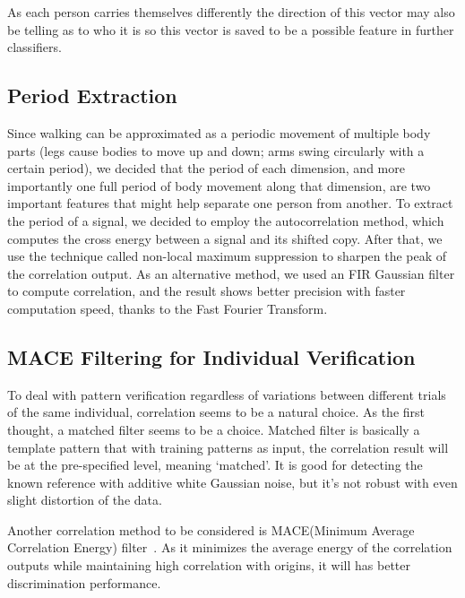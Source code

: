 \documentclass[10pt,twocolumn,letterpaper]{article}
\begin{document}
\begin{figure}[t]
\begin{center}
\fbox{\rule{0pt}{2in} \rule{0.9\linewidth}{0pt}}
   \caption{}
\end{center}
\end{figure}

As each person carries themselves differently the direction of this vector may also be telling as to who it is so this vector is saved to be a possible feature in further classifiers.

\subsection{Period Extraction}
Since walking can be approximated as a periodic movement of multiple body parts (legs cause bodies to move up and down; arms swing circularly with a certain period), we decided that the period of each dimension, and more importantly one full period of body movement along that dimension, are two important features that might help separate one person from another. To extract the period of a signal, we decided to employ the autocorrelation method, which computes the cross energy between a signal and its shifted copy. After that, we use the technique called non-local maximum suppression to sharpen the peak of the correlation output. As an alternative method, we used an FIR Gaussian filter to compute correlation, and the result shows better precision with faster computation speed, thanks to the Fast Fourier Transform.

\subsection{MACE Filtering for Individual Verification}
To deal with pattern verification regardless of variations between different trials of the same individual, correlation seems to be a natural choice. As the first thought, a matched filter seems to be a choice. Matched filter is basically a template pattern that with training patterns as input, the correlation result will be at the pre-specified level, meaning ‘matched’. It is good for detecting the known reference with additive white Gaussian noise, but it’s not robust with even slight distortion of the data. 

Another correlation method to be considered is MACE(Minimum Average Correlation Energy) filter~\cite{Author01}. As it minimizes the average energy of the correlation outputs while maintaining high correlation with origins, it will has better discrimination performance. 
\end{document}
